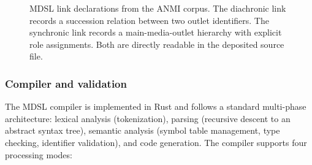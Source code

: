 \documentclass[11pt]{article}
\begin{document}
\begin{figure}[t]
  \centering
  \caption{MDSL link declarations from the ANMI corpus. The diachronic link records a succession relation between two outlet identifiers. The synchronic link records a main-media-outlet hierarchy with explicit role assignments. Both are directly readable in the deposited source file.}
  \label{fig:dsl_links}
\end{figure}

\subsubsection*{Compiler and validation}

The MDSL compiler is implemented in Rust and follows a standard multi-phase architecture: lexical analysis (tokenization), parsing (recursive descent to an abstract syntax tree), semantic analysis (symbol table management, type checking, identifier validation), and code generation. The compiler supports four processing modes:
\end{document}
